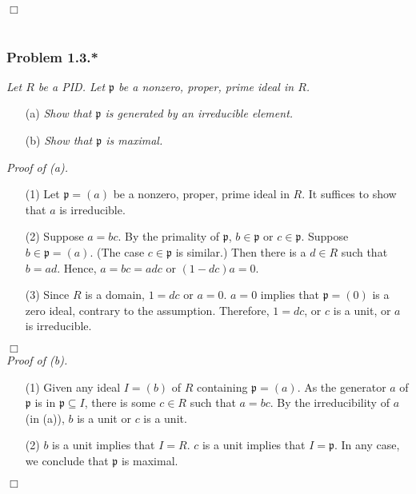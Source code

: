 \documentclass{article}
\begin{document}
$\Box$ \\\\






\subsubsection*{Problem 1.3.*}
\emph{Let $R$ be a PID. Let $\mathfrak{p}$ be a nonzero, proper, prime ideal in $R$.}
\begin{enumerate}
\item[(a)]
  \emph{Show that $\mathfrak{p}$ is generated by an irreducible element.}

\item[(b)]
  \emph{Show that $\mathfrak{p}$ is maximal.} \\
\end{enumerate}



\emph{Proof of (a).}
\begin{enumerate}
\item[(1)]
  Let $\mathfrak{p} = (a)$ be a nonzero, proper, prime ideal in $R$.
  It suffices to show that $a$ is irreducible.

\item[(2)]
  Suppose $a = bc$.
  By the primality of $\mathfrak{p}$, $b \in \mathfrak{p}$ or $c \in \mathfrak{p}$.
  Suppose $b \in \mathfrak{p} = (a)$. (The case $c \in \mathfrak{p}$ is similar.)
  Then there is a $d \in R$ such that $b = ad$.
  Hence, $a = bc = adc$ or $(1-dc)a = 0$.

\item[(3)]
  Since $R$ is a domain, $1 = dc$ or $a = 0$.
  $a = 0$ implies that $\mathfrak{p} = (0)$ is a zero ideal, contrary to the assumption.
  Therefore, $1 = dc$, or $c$ is a unit, or $a$ is irreducible.
\end{enumerate}
$\Box$ \\



\emph{Proof of (b).}
\begin{enumerate}
\item[(1)]
  Given any ideal $I = (b)$ of $R$ containing $\mathfrak{p} = (a)$.
  As the generator $a$ of $\mathfrak{p}$ is in $\mathfrak{p} \subseteq I$,
  there is some $c \in R$ such that $a = bc$.
  By the irreducibility of $a$ (in (a)), $b$ is a unit or $c$ is a unit.

\item[(2)]
  $b$ is a unit implies that $I = R$.
  $c$ is a unit implies that $I = \mathfrak{p}$.
  In any case, we conclude that $\mathfrak{p}$ is maximal.
\end{enumerate}
$\Box$ \\\\
\end{document}
